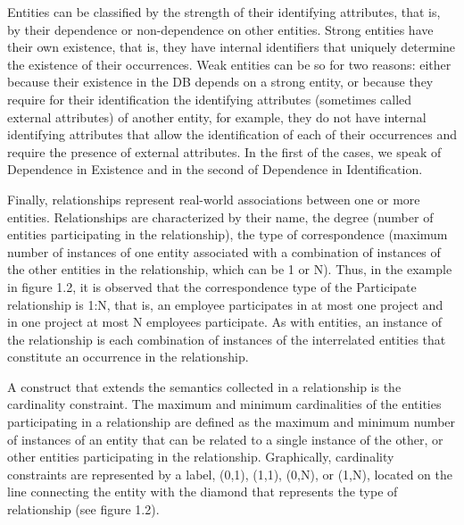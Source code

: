 \documentclass{article}
\numberwithin{figure}{section}
\begin{document}
Entities can be classified by the strength of their identifying attributes, that is, by their dependence or non-dependence on other entities.  Strong entities have their own existence, that is, they have internal identifiers that uniquely determine the existence of their occurrences.  Weak entities can be so for two reasons: either because their existence in the DB depends on a strong entity, or because they require for their identification the identifying attributes (sometimes called external attributes) of another entity, for example, they do not have internal identifying attributes that allow the identification of each of their occurrences and require the presence of external attributes.  In the first of the cases, we speak of Dependence in Existence and in the second of Dependence in Identification.

Finally, relationships represent real-world associations between one or more entities.  Relationships are characterized by their name, the degree (number of entities participating in the relationship), the type of correspondence (maximum number of instances of one entity associated with a combination of instances of the other entities in the relationship, which can be 1 or N).  Thus, in the example in figure 1.2, it is observed that the correspondence type of the Participate relationship is 1:N, that is, an employee participates in at most one project and in one project at most N employees participate.  As with entities, an instance of the relationship is each combination of instances of the interrelated entities that constitute an occurrence in the relationship.

A construct that extends the semantics collected in a relationship is the cardinality constraint.  The maximum and minimum cardinalities of the entities participating in a relationship are defined as the maximum and minimum number of instances of an entity that can be related to a single instance of the other, or other entities participating in the relationship.  Graphically, cardinality constraints are represented by a label, (0,1), (1,1), (0,N), or (1,N), located on the line connecting the entity with the diamond that represents the type of relationship (see figure 1.2).
\end{document}
